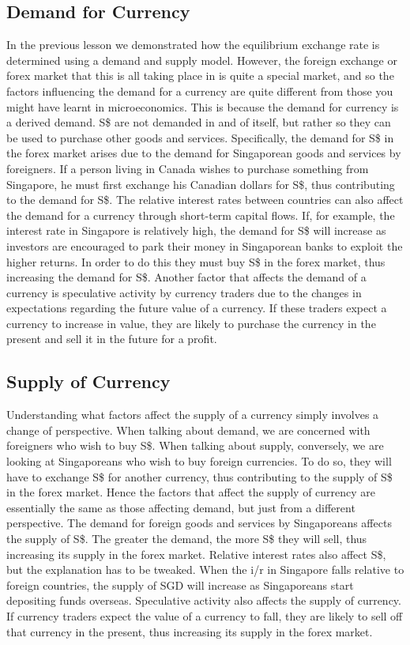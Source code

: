 \documentclass[DIV=classic,11pt,numbers=noenddot,listof=totoc,bibliography=totoc,parskip]{scrartcl}
\begin{document}
\subsection{Demand for Currency}
In the previous lesson we demonstrated how the equilibrium exchange rate is determined using a demand and supply model. However, the foreign exchange or forex market that this is all taking place in is quite a special market, and so the factors influencing the demand for a currency are quite different from those you might have learnt in microeconomics. This is because the demand for currency is a derived demand. S\$ are not demanded in and of itself, but rather so they can be used to purchase other goods and services. Specifically, the demand for S\$ in the forex market arises due to the demand for Singaporean goods and services by foreigners. If a person living in Canada wishes to purchase something from Singapore, he must first exchange his Canadian dollars for S\$, thus contributing to the demand for S\$. The relative interest rates between countries can also affect the demand for a currency through short-term capital flows. If, for example, the interest rate in Singapore is relatively high, the demand for S\$ will increase as investors are encouraged to park their money in Singaporean banks to exploit the higher returns. In order to do this they must buy S\$ in the forex market, thus increasing the demand for S\$. Another factor that affects the demand of a currency is speculative activity by currency traders due to the changes in expectations regarding the future value of a currency. If these traders expect a currency to increase in value, they are likely to purchase the currency in the present and sell it in the future for a profit.
\subsection{Supply of Currency}
Understanding what factors affect the supply of a currency simply involves a change of perspective. When talking about demand, we are concerned with foreigners who wish to buy S\$. When talking about supply, conversely, we are looking at Singaporeans who wish to buy foreign currencies. To do so, they will have to exchange S\$ for another currency, thus contributing to the supply of S\$ in the forex market. Hence the factors that affect the supply of currency are essentially the same as those affecting demand, but just from a different perspective. The demand for foreign goods and services by Singaporeans affects the supply of S\$. The greater the demand, the more S\$ they will sell, thus increasing its supply in the forex market. Relative interest rates also affect S\$, but the explanation has to be tweaked.  When the i/r in Singapore falls relative to foreign countries, the supply of SGD will increase as Singaporeans start depositing funds overseas. Speculative activity also affects the supply of currency. If currency traders expect the value of a currency to fall, they are likely to sell off that currency in the present, thus increasing its supply in the forex market.
\end{document}
